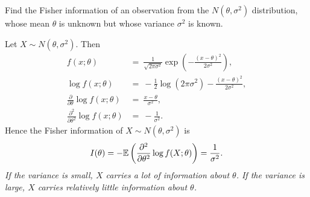 %


\begin{example}\label{example:fisher_information_normal}
Find the Fisher information of an observation from the $N(\theta,\sigma^2)$ distribution, whose mean $\theta$ is unknown but whose variance $\sigma^2$ is known. 

\begin{solution}
Let $X\sim N(\theta,\sigma^2)$. Then
\begin{align*}
f(x;\theta) 
	& = \ \frac{1}{\sqrt{2\pi\sigma^2}}\exp\left(-\frac{(x-\theta)^2}{2\sigma^2}\right), \\
\log f(x;\theta) 
	& = \ -\frac{1}{2}\log(2\pi\sigma^2) - \frac{(x-\theta)^2}{2\sigma^2}, \\
\frac{\partial}{\partial\theta} \log f(x;\theta)
	& = \ \frac{x-\theta}{\sigma^2}, \\
\frac{\partial^2}{\partial\theta^2} \log f(x;\theta)
	& = \ -\frac{1}{\sigma^2}.
\end{align*}
Hence the Fisher information of $X\sim N(\theta,\sigma^2)$ is 
\[
I(\theta)
	= -\mathbb{E}\left(\frac{\partial^2}{\partial\theta^2}\log f(X;\theta)\right)
	= \frac{1}{\sigma^2}.
\]
\bit
\it If the variance is small, $X$ carries a lot of information about $\theta$.
\it If the variance is large, $X$ carries relatively little information about $\theta$.
\eit
\end{solution}
\end{example}

